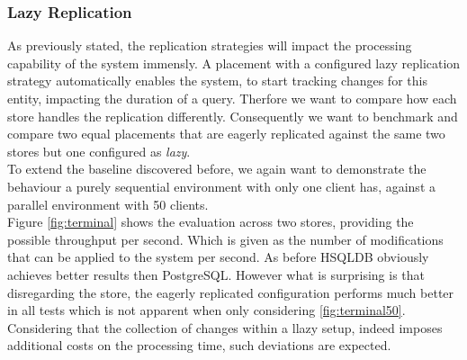 



\subsubsection{Lazy Replication} 


As previously stated, the replication strategies will impact the processing capability of the system immensly.
A placement with a configured lazy replication strategy automatically enables the system, to start tracking changes for this entity, impacting the duration of a query.
Therfore we want to compare how each store handles the replication differently. Consequently we want to benchmark and compare two equal placements that are eagerly replicated
against the same two stores but one configured as \emph{lazy}.\\

To extend the baseline discovered before, we again want to demonstrate the behaviour a purely sequential environment with only one client has, 
against a parallel environment with 50 clients.\\
Figure \ref{fig:terminal} shows the evaluation across two stores, providing the possible throughput per second. Which is given as the number of modifications that can be 
applied to the system per second. As before HSQLDB obviously achieves better results then PostgreSQL. However what is surprising is that disregarding the store,
the eagerly replicated configuration performs much better in all tests which is not apparent when only considering \ref{fig:terminal50}.
Considering that the collection of changes within a llazy setup, indeed imposes additional costs on the processing time, such deviations are expected.

